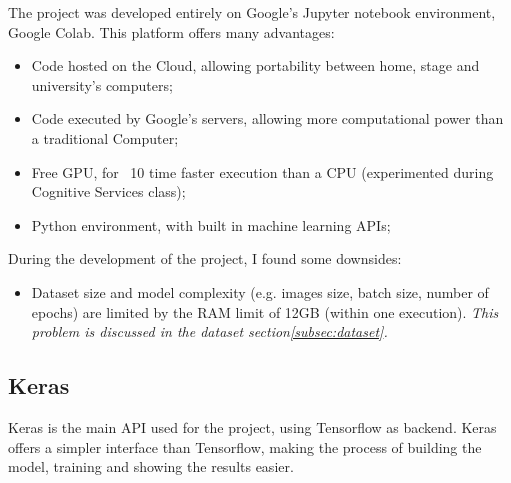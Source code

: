 \documentclass[twocolumn,showpacs,%
  nofootinbib,aps,superscriptaddress,%
  eqsecnum,prd,notitlepage,showkeys,10pt]{revtex4-1}
\begin{document}
The project was developed entirely on Google's Jupyter notebook environment, Google Colab. This platform offers many advantages:\\
\begin{itemize}
    \item Code hosted on the Cloud, allowing portability between home, stage and university's computers;
    \item Code executed by Google's servers, allowing more computational power than a traditional Computer;
    \item Free GPU, for ~10 time faster execution than a CPU (experimented during Cognitive Services class);
    \item Python environment, with built in machine learning APIs;
\end{itemize}
During the development of the project, I found some downsides:
\begin{itemize}\label{subsec:colab:downsides}
    \item Dataset size and model complexity (e.g. images size, batch size, number of epochs) are limited by the RAM limit of 12GB (within one execution). \textit{This problem is discussed in the dataset section\ref{subsec:dataset}.}
\end{itemize}

\subsection{Keras}
Keras is the main API used for the project, using Tensorflow as backend. Keras offers a simpler interface than Tensorflow, making the process of building the model, training and showing the results easier.
\end{document}
